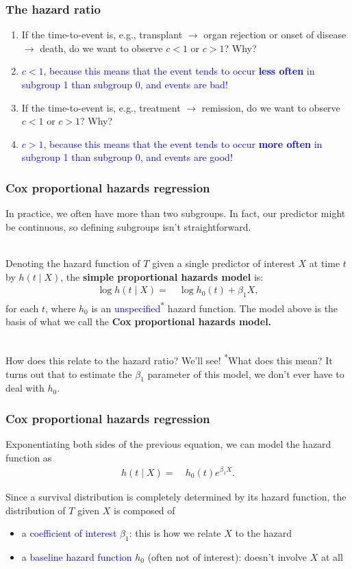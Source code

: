 \documentclass[10pt,t]{beamer}
\begin{document}
\begin{frame}
\frametitle{The hazard ratio}
\begin{enumerate}
\item If the time-to-event is, e.g., transplant $\rightarrow$ organ rejection or onset of disease $\rightarrow$ death, do we want to observe $c < 1$ or $c > 1$? Why?
\item[] \textcolor{blue}{$c < 1$, because this means that the event tends to occur \textbf{less often} in subgroup 1 than subgroup 0, and events are bad!}
\item If the time-to-event is, e.g., treatment $\rightarrow$ remission, do we want to observe $c < 1$ or $c > 1$? Why?
\item[] \textcolor{blue}{$c > 1$, because this means that the event tends to occur \textbf{more often} in subgroup 1 than subgroup 0, and events are good!}
\end{enumerate}
\end{frame}

\begin{frame}
\frametitle{Cox proportional hazards regression}
In practice, we often have more than two subgroups. In fact, our predictor might be continuous, so defining subgroups isn't straightforward.
\\ ~\ 

Denoting the hazard function of $T$ given a single predictor of interest $X$ at time $t$ by $h(t \mid X)$, the \textbf{simple proportional hazards model} is:
\begin{align*}
\log h(t \mid X) = & \ \log h_0(t) + \beta_1 X,
\end{align*}
for each $t$, where $h_0$ is an \textcolor{blue}{unspecified\textsuperscript{*}} hazard function. The model above is the basis of what we call the \textbf{Cox proportional hazards model.}
\\ ~\ 

How does this relate to the hazard ratio? We'll see!
\vfill
\small{\textsuperscript{*}What does this mean? It turns out that to estimate the $\beta_1$ parameter of this model, we don't ever have to deal with $h_0$.}
\end{frame}

\begin{frame}
\frametitle{Cox proportional hazards regression}
Exponentiating both sides of the previous equation, we can model the hazard function as
\begin{align*}
h(t \mid X) = & \ h_0(t)e^{\beta_1 X}.
\end{align*}

Since a survival distribution is completely determined by its hazard function, the distribution of $T$ given $X$ is composed of
\begin{itemize}
\item a \textcolor{blue}{coefficient of interest} $\beta_1$: this is how we relate $X$ to the hazard
\item a \textcolor{blue}{baseline hazard function} $h_0$ (often not of interest): doesn't involve $X$ at all
\end{itemize}
\end{frame}
\end{document}
